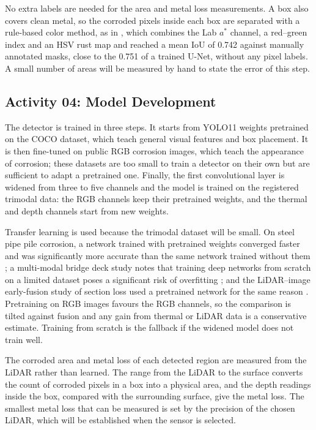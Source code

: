 No extra labels are needed for the area and metal loss measurements. A box also
covers clean metal, so the corroded pixels inside each box are separated with a
rule-based color method, as in \citet{Alvani2026}, which combines the Lab
$a^*$ channel, a red--green index and an HSV rust map and reached a mean IoU of
0.742 against manually annotated masks, close to the 0.751 of a trained U-Net,
without any pixel labels. A small number of areas will be measured by hand to
state the error of this step.

\subsection{Activity 04: Model Development}
\label{sec:model}

The detector is trained in three steps. It starts from YOLO11 weights pretrained
on the COCO dataset, which teach general visual features and box placement. It
is then fine-tuned on public RGB corrosion images, which teach the appearance of
corrosion; these datasets are too small to train a detector on their own but are
sufficient to adapt a pretrained one. Finally, the first convolutional layer is
widened from three to five channels and the model is trained on the registered
trimodal data: the RGB channels keep their pretrained weights, and the thermal
and depth channels start from new weights.

Transfer learning is used because the trimodal dataset will be small. On steel
pipe pile corrosion, a network trained with pretrained weights converged faster
and was significantly more accurate than the same network trained without them
\citep{Han2024}; a multi-modal bridge deck study notes that training deep
networks from scratch on a limited dataset poses a significant risk of
overfitting \citep{Rashidi2026}; and the LiDAR--image early-fusion study of
section loss used a pretrained network for the same reason \citep{Maru2025}.
Pretraining on RGB images favours the RGB channels, so the comparison is tilted
against fusion and any gain from thermal or LiDAR data is a conservative
estimate. Training from scratch is the fallback if the widened model does not
train well.

The corroded area and metal loss of each detected region are measured from the
LiDAR rather than learned. The range from the LiDAR to the surface converts the
count of corroded pixels in a box into a physical area, and the depth readings
inside the box, compared with the surrounding surface, give the metal loss. The
smallest metal loss that can be measured is set by the precision of the chosen
LiDAR, which will be established when the sensor is selected.

